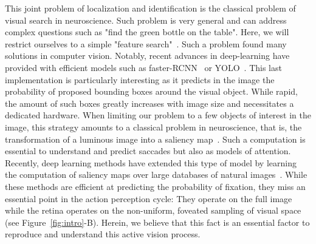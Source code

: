 This joint problem of localization and identification is the classical problem of visual search in neuroscience. Such problem is very general and can address complex questions such as "find the green bottle on the table". Here, we will restrict ourselves to a simple "feature search"~\citep{Treisman80}. Such a problem found many solutions in computer vision. Notably, recent advances in deep-learning have provided with efficient models such as faster-RCNN~\citep{Ren17} or YOLO~\citep{Redmon15}. This last implementation is particularly interesting as it predicts in the image the probability of proposed bounding boxes around the visual object. While rapid, the amount of such boxes greatly increases with image size and necessitates a dedicated hardware. When limiting our problem to a few objects of interest in the image, this strategy amounts to a classical problem in neuroscience, that is, the transformation of a luminous image into a saliency map~\citep{Itti01}. Such a computation is essential to understand and predict saccades but also as models of attention. Recently, deep learning methods have extended this  type of model by learning the computation of saliency maps over large databases of natural images~\citep{Kummerer16}. While these methods are efficient at predicting the probability of fixation, they miss an essential point in the action perception cycle: They operate on the full image while the retina operates on the non-uniform, foveated sampling of visual space (see Figure~\ref{fig:intro}-B). Herein, we believe that this fact is an essential factor to reproduce and understand this active vision process.


